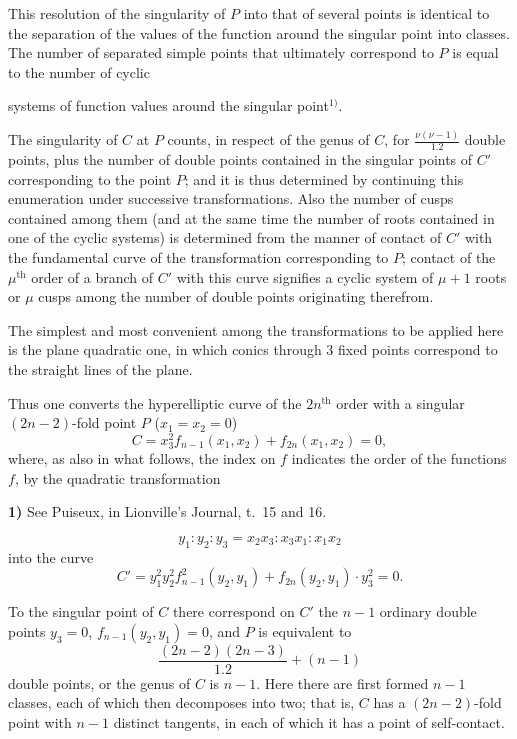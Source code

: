 \documentclass{article}
\begin{document}
This resolution of the singularity of $P$ into that of several points is identical to the separation of the values of the function around the singular point into classes. The number of separated simple points that ultimately correspond to $P$ is equal to the number of cyclic

systems of function values around the singular point${}^{1)}$.

The singularity of $C$ at $P$ counts, in respect of the genus of $C$, for $\frac{\nu(\nu-1)}{1.2}$ double points, plus the number of double points contained in the singular points of $C'$ corresponding to the point $P$; and it is thus determined by continuing this enumeration under successive transformations. Also the number of cusps contained among them (and at the same time the number of roots contained in one of the cyclic systems) is determined from the manner of contact of $C'$ with the fundamental curve of the transformation corresponding to $P$; contact of the $\mu^{\text{th}}$ order of a branch of $C'$ with this curve signifies a cyclic system of $\mu+1$ roots or $\mu$ cusps among the number of double points originating therefrom.

The simplest and most convenient among the transformations to be applied here is the plane quadratic one, in which conics through 3 fixed points correspond to the straight lines of the plane.

Thus one converts the hyperelliptic curve of the $2n^{\text{th}}$ order with a singular $(2n-2)$-fold point $P$ ($x_1 = x_2 = 0$)
\[ C = x_3^2 f_{n-1}(x_1, x_2) + f_{2n}(x_1, x_2) = 0, \]
where, as also in what follows, the index on $f$ indicates the order of the functions $f$, by the quadratic transformation

\textbf{1)} See Puiseux, in Lionville's Journal, t.\ 15 and 16.

\[ y_1 : y_2 : y_3 = x_2 x_3 : x_3 x_1 : x_1 x_2 \]
into the curve
\[ C' = y_1^2 y_2^2 f_{n-1}^2(y_2, y_1) + f_{2n}(y_2, y_1) \cdot y_3^2 = 0. \]

To the singular point of $C$ there correspond on $C'$ the $n-1$ ordinary double points $y_3 = 0$, $f_{n-1}(y_2, y_1) = 0$, and $P$ is equivalent to
\[ \frac{(2n-2)(2n-3)}{1.2} + (n-1) \]
double points, or the genus of $C$ is $n-1$. Here there are first formed $n-1$ classes, each of which then decomposes into two; that is, $C$ has a $(2n-2)$-fold point with $n-1$ distinct tangents, in each of which it has a point of self-contact.
\end{document}

